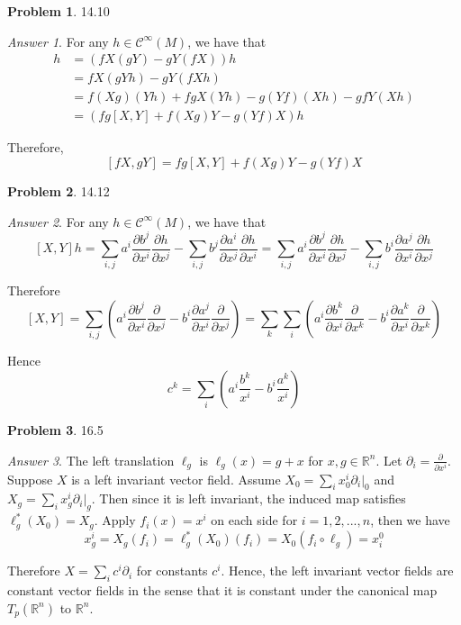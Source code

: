 \documentclass[10pt,a4paper]{article}
\theoremstyle{plain}
\theoremstyle{definition}
\newtheorem*{problem*}{Problem}
\theoremstyle{remark}
\newtheorem*{answer*}{Answer}
\newcommand{\sC}{\mathcal{C}}
\newcommand{\IR}{\mathbb{R}}
\newcommand{\<}{\langle}
\renewcommand{\>}{\rangle}
\newcommand{\p}{\partial}
\begin{document}
\begin{problem*} 14.10
\end{problem*}

\begin{answer*} \hfill

For any $h \in \sC^\infty(M)$, we have that
\begin{align*}
[fX,gY]h &= (fX(gY)-gY(fX))h \\
&= fX(gYh) - gY(fXh) \\
&= f(Xg)(Yh)+fgX(Yh) - g(Yf)(Xh) - gfY(Xh) \\
&= (fg[X,Y] + f(Xg)Y - g(Yf)X) h
\end{align*}

Therefore,
\[[fX,gY] = fg[X,Y] + f(Xg)Y - g(Yf)X\]

\end{answer*}

\begin{problem*} 14.12
\end{problem*}

\begin{answer*}\hfill

For any $h\in \sC^\infty(M)$, we have that
\[[X,Y]h = \sum_{i,j} a^i\frac{\p b^j}{\p x^i}\frac{\p h}{\p x^j} - \sum_{i,j}b^j\frac{\p a^i}{\p x^j}\frac{\p h}{\p x^i} = \sum_{i,j} a^i\frac{\p b^j}{\p x^i}\frac{\p h}{\p x^j} - \sum_{i,j} b^i\frac{\p a^j}{\p x^i}\frac{\p h}{\p x^j}\]

Therefore \[[X,Y] = \sum_{i,j} \left(a^i\frac{\p b^j}{\p x^i}\frac{\p }{\p x^j} - b^i\frac{\p a^j}{\p x^i}\frac{\p }{\p x^j}\right) = \sum_k \sum_i \left(a^i\frac{\p b^k}{\p x^i}\frac{\p }{\p x^k} - b^i\frac{\p a^k}{\p x^i}\frac{\p }{\p x^k}\right)\]

Hence \[c^k = \sum_i \left(a^i\frac{b^k}{x^i}-b^i\frac{a^k}{x^i}\right)\]

\end{answer*}

\newpage

\begin{problem*} 16.5
\end{problem*}

\begin{answer*} \hfill

The left translation $\ell_g$ is $\ell_g(x) = g+x$ for $x,g\in \IR^n$. Let $\p_i = \frac{\p}{\p x^i}$. Suppose $X$ is a left invariant vector field. Assume $X_0 = \sum_i x_0^i \p_i|_0$ and $X_g = \sum_i x_g^i \p_i|_g$. Then since it is left invariant, the induced map satisfies $\ell_g^*(X_0) =  X_g$. Apply $f_i(x) = x^i$ on each side for $i = 1,2,...,n$, then we have
\[x_g^i = X_g(f_i) = \ell_g^*(X_0)(f_i) = X_0(f_i \circ \ell_g) = x_i^0\]

Therefore $X = \sum_i c^i \p_i$ for constants $c^i$. Hence, the left invariant vector fields are constant vector fields in the sense that it is constant under the canonical map $T_p(\IR^n)$ to $\IR^n$. \\

\end{answer*}
\end{document}
